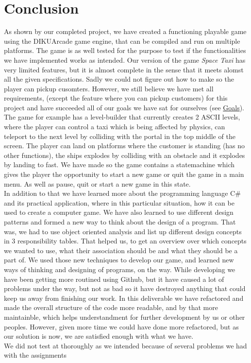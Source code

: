 \documentclass[../master.tex]{subfiles}
\begin{document}
\section{Conclusion}
As shown by our completed project, we have created a functioning playable game using the DIKUArcade game engine, that can be compiled and run on multiple platforms. The game is as well tested for the purpose to test if the functionalities we have implemented works as intended. Our version of the game \textit{Space Taxi} has very limited features, but it is almost complete in the sense that it meets alomst all the given specifications. Sadly we could not figure out how to make so the player can pickup cusomters. However, we still believe we have met all requirements, (except the feature where you can pickup customers) for this project and have succeeded all of our goals we have sat for ourselves (see \hyperref[sec:Goals]{Goals}).\\
 
The game for example has a level-builder that currently creates 2 ASCII levels, where the player can control a taxi which is being affected by physics, can teleport to the next level by colliding with the portal in the top middle of the screen. The player can land on platforms where the customer is standing (has no other functions), the ships explodes by colliding with an obstacle and it explodes by landing to fast. We have made so the game contains a statemachine which gives the player the opportunity to start a new game or quit the game in a main menu. As well as pause, quit or start a new game in this state.\\

In addition to that we have learned more about the programming language C\# and its practical application, where in this particular situation, how it can be used to create a computer game. We have also learned to use different design patterns and formed a new way to think about the design of a program. That was, we had to use object oriented analysis and list up different design concepts in 3 responsibility tables. That helped us, to get an overview over which concepts we wanted to use, what their association should be and what they should be a part of. We used those new techniques to develop our game, and learned new ways of thinking and designing of programs, on the way. While developing we have been getting more routined using Github, but it have caused a lot of problems under the way, but not as bad so it have destroyed anything that could keep us away from finishing our work. In this deliverable we have refactored and made the overall structure of the code more readable, and by that more maintainble, which helps understandment for further development by us or other peoples. However, given more time we could have done more refactored, but as our solution is now, we are satisfied enough with what we have.\\
We did not test at thoroughly as we intended because of several problems we had with the assignments
\end{document}
